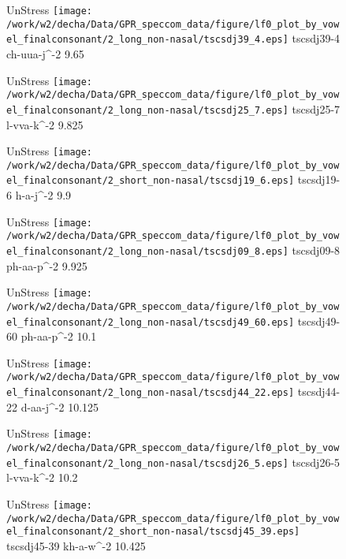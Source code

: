 \documentclass{article}
\begin{document}
\begin{figure}[t]
\begin{minipage}[b]{.24\textwidth}
UnStress
\centering
\texttt{[image: /work/w2/decha/Data/GPR\_speccom\_data/figure/lf0\_plot\_by\_vowel\_finalconsonant/2\_long\_non-nasal/tscsdj39\_4.eps]}
tscsdj39-4 ch-uua-j\textasciicircum-2 9.65
\end{minipage}
\begin{minipage}[b]{.24\textwidth}
UnStress
\centering
\texttt{[image: /work/w2/decha/Data/GPR\_speccom\_data/figure/lf0\_plot\_by\_vowel\_finalconsonant/2\_long\_non-nasal/tscsdj25\_7.eps]}
tscsdj25-7 l-vva-k\textasciicircum-2 9.825
\end{minipage}
\begin{minipage}[b]{.24\textwidth}
UnStress
\centering
\texttt{[image: /work/w2/decha/Data/GPR\_speccom\_data/figure/lf0\_plot\_by\_vowel\_finalconsonant/2\_short\_non-nasal/tscsdj19\_6.eps]}
tscsdj19-6 h-a-j\textasciicircum-2 9.9
\end{minipage}
\begin{minipage}[b]{.24\textwidth}
UnStress
\centering
\texttt{[image: /work/w2/decha/Data/GPR\_speccom\_data/figure/lf0\_plot\_by\_vowel\_finalconsonant/2\_long\_non-nasal/tscsdj09\_8.eps]}
tscsdj09-8 ph-aa-p\textasciicircum-2 9.925
\end{minipage}
\end{figure}
\clearpage
\begin{figure}[t]
\begin{minipage}[b]{.24\textwidth}
UnStress
\centering
\texttt{[image: /work/w2/decha/Data/GPR\_speccom\_data/figure/lf0\_plot\_by\_vowel\_finalconsonant/2\_long\_non-nasal/tscsdj49\_60.eps]}
tscsdj49-60 ph-aa-p\textasciicircum-2 10.1
\end{minipage}
\begin{minipage}[b]{.24\textwidth}
UnStress
\centering
\texttt{[image: /work/w2/decha/Data/GPR\_speccom\_data/figure/lf0\_plot\_by\_vowel\_finalconsonant/2\_long\_non-nasal/tscsdj44\_22.eps]}
tscsdj44-22 d-aa-j\textasciicircum-2 10.125
\end{minipage}
\begin{minipage}[b]{.24\textwidth}
UnStress
\centering
\texttt{[image: /work/w2/decha/Data/GPR\_speccom\_data/figure/lf0\_plot\_by\_vowel\_finalconsonant/2\_long\_non-nasal/tscsdj26\_5.eps]}
tscsdj26-5 l-vva-k\textasciicircum-2 10.2
\end{minipage}
\begin{minipage}[b]{.24\textwidth}
UnStress
\centering
\texttt{[image: /work/w2/decha/Data/GPR\_speccom\_data/figure/lf0\_plot\_by\_vowel\_finalconsonant/2\_short\_non-nasal/tscsdj45\_39.eps]}
tscsdj45-39 kh-a-w\textasciicircum-2 10.425
\end{minipage}
\end{figure}
\end{document}

